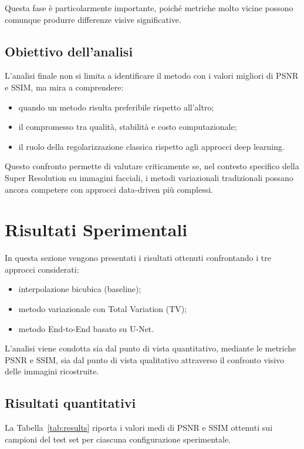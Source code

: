 \documentclass{article}
\begin{document}
Questa fase è particolarmente importante, poiché metriche molto vicine possono comunque produrre differenze visive significative.

\subsection{Obiettivo dell’analisi}

L’analisi finale non si limita a identificare il metodo con i valori migliori di PSNR e SSIM, ma mira a comprendere:

\begin{itemize}
    \item quando un metodo risulta preferibile rispetto all’altro;
    \item il compromesso tra qualità, stabilità e costo computazionale;
    \item il ruolo della regolarizzazione classica rispetto agli approcci deep learning.
\end{itemize}

Questo confronto permette di valutare criticamente se, nel contesto specifico della Super Resolution su immagini facciali, i metodi variazionali tradizionali possano ancora competere con approcci data-driven più complessi.

\newpage
\section{Risultati Sperimentali}

In questa sezione vengono presentati i risultati ottenuti confrontando i tre approcci considerati:

\begin{itemize}
    \item interpolazione bicubica (baseline);
    \item metodo variazionale con Total Variation (TV);
    \item metodo End-to-End basato su U-Net.
\end{itemize}

L’analisi viene condotta sia dal punto di vista quantitativo, mediante le metriche PSNR e SSIM, sia dal punto di vista qualitativo attraverso il confronto visivo delle immagini ricostruite.

\subsection{Risultati quantitativi}

La Tabella~\ref{tab:results} riporta i valori medi di PSNR e SSIM ottenuti sui campioni del test set per ciascuna configurazione sperimentale.
\end{document}
